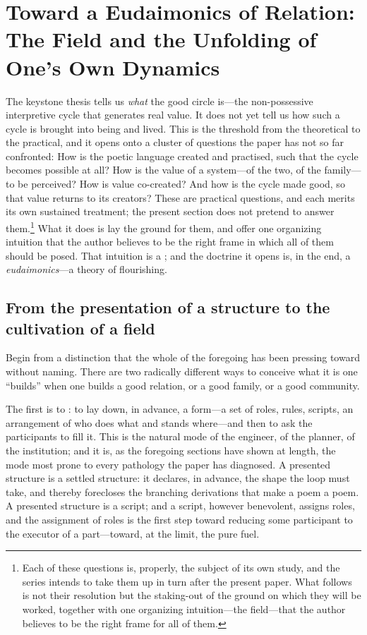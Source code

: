 \section{Toward a Eudaimonics of Relation: The Field and the Unfolding of One's Own Dynamics}
\label{p09:sec:eudaimonia}

\noindent
The keystone thesis tells us \emph{what} the good circle is---the non-possessive interpretive cycle that generates real value. It does not yet tell us how such a cycle is brought into being and lived. This is the threshold from the theoretical to the practical, and it opens onto a cluster of questions the paper has not so far confronted: How is the poetic language created and practised, such that the cycle becomes possible at all? How is the value of a system---of the two, of the family---to be perceived? How is value co-created? And how is the cycle made good, so that value returns to its creators? These are practical questions, and each merits its own sustained treatment; the present section does not pretend to answer them.\footnote{Each of these questions is, properly, the subject of its own study, and the series intends to take them up in turn after the present paper. What follows is not their resolution but the staking-out of the ground on which they will be worked, together with one organizing intuition---the field---that the author believes to be the right frame for all of them.} What it does is lay the ground for them, and offer one organizing intuition that the author believes to be the right frame in which all of them should be posed. That intuition is a ; and the doctrine it opens is, in the end, a \emph{eudaimonics}---a theory of flourishing.

\subsection{From the presentation of a structure to the cultivation of a field}
\label{p09:sec:field-intuition}

Begin from a distinction that the whole of the foregoing has been pressing toward without naming. There are two radically different ways to conceive what it is one ``builds'' when one builds a good relation, or a good family, or a good community.

The first is to : to lay down, in advance, a form---a set of roles, rules, scripts, an arrangement of who does what and stands where---and then to ask the participants to fill it. This is the natural mode of the engineer, of the planner, of the institution; and it is, as the foregoing sections have shown at length, the mode most prone to every pathology the paper has diagnosed. A presented structure is a settled structure: it declares, in advance, the shape the loop must take, and thereby forecloses the branching derivations that make a poem a poem. A presented structure is a script; and a script, however benevolent, assigns roles, and the assignment of roles is the first step toward reducing some participant to the executor of a part---toward, at the limit, the pure fuel.

